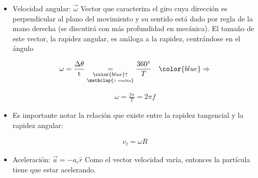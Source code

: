 \documentclass[letterpaper,11pt]{article}
\begin{document}
\begin{itemize}
    \item Velocidad angular: $\vec{\omega}$
    \newline Vector que caracteriza el giro cuya dirección es perpendicular al plano del movimiento y su sentido está dado por regla de la mano derecha (se discutirá con más profundidad en mecánica). El tamaño de este vector, la rapidez angular, es análoga a la rapidez, centrándose en el ángulo
    \begin{center}
        \begin{minipage}{0.20\linewidth}
            \begin{align*}
                \omega = \frac{\Delta \theta}{\text{t}} \underset{\substack{\color{blue}\uparrow \\ \mathclap{\textup{\tiny 1 vuelta}}}} {=} \frac{360^{\circ}}{T} \quad \color{blue}\Rightarrow
            \end{align*}
        \end{minipage}
        \hspace{0.5em}
        \begin{minipage}{0.2\linewidth}
            \begin{tcolorbox}[colback=white, colframe=blue, width=1\linewidth]
                \vspace{-1.1em}
                \begin{align*}
                    \omega = \frac{2\pi}{T} = 2\pi f
                \end{align*}
            \end{tcolorbox}
        \end{minipage}
    \end{center}
    
    \item[] Es importante notar la relación que existe entre la rapidez tangencial y la rapidez angular:
    \begin{center}
        \begin{tcolorbox}[colback=white, colframe=blue, width=0.2\linewidth]
            \vspace{-1.5em}
            \begin{align*}
                v_t = \omega R
            \end{align*}
        \end{tcolorbox}
    \end{center}

    \item Aceleración: $\vec{a} = -a_c\hat{r}$
    \newline Como el vector velocidad varía, entonces la partícula tiene que estar acelerando.


\end{itemize}
\end{document}

